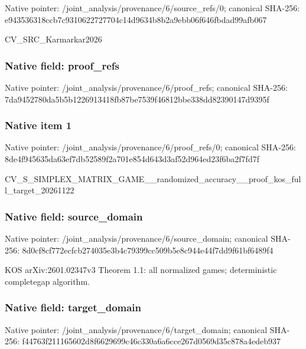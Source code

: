 \documentclass[10pt,a4paper]{article}
\begin{document}
Native pointer: /joint\_analysis/provenan\allowbreak{}ce/6/source\_refs/0; canonical SHA-256: e943536318ccb7c931062272\allowbreak{}7704c14d9634b8b2a9ebb06f\allowbreak{}646fbdad99afb067


CV\_SRC\_Karmarkar2026


\subsubsection{Native field: proof\_refs}


Native pointer: /joint\_analysis/provenance/6/proof\_refs; canonical SHA-256: 7da9452780da5b5b12269134\allowbreak{}18fb87be7539f46812bbe338\allowbreak{}dd82390147d9395f



\subsubsection{Native item 1}


Native pointer: /joint\_analysis/provenan\allowbreak{}ce/6/proof\_refs/0; canonical SHA-256: 8de4f945635da63ef7db5258\allowbreak{}9f2a701e854d643d3af52d96\allowbreak{}4ed23f6ba2f7fd7f


CV\_S\_SIMPLEX\_MATRIX\_GAME\allowbreak{}\_\_randomized\_accuracy\_\_p\allowbreak{}roof\_kos\_full\_target\_202\allowbreak{}61122


\subsubsection{Native field: source\_domain}


Native pointer: /joint\_analysis/provenan\allowbreak{}ce/6/source\_domain; canonical SHA-256: 8d0cf8cf772ecfcb274035e3\allowbreak{}b4c79399cc509b5e8c944e44\allowbreak{}f7dd9f61bf6489f4


KOS arXiv:2601.02347v3 Theorem 1.1: all normalized games; deterministic completegap algorithm.


\subsubsection{Native field: target\_domain}


Native pointer: /joint\_analysis/provenan\allowbreak{}ce/6/target\_domain; canonical SHA-256: f44763f211165602d8f66296\allowbreak{}99c46c330a6a6cce267d0569\allowbreak{}d35c878a4edeb937
\end{document}
